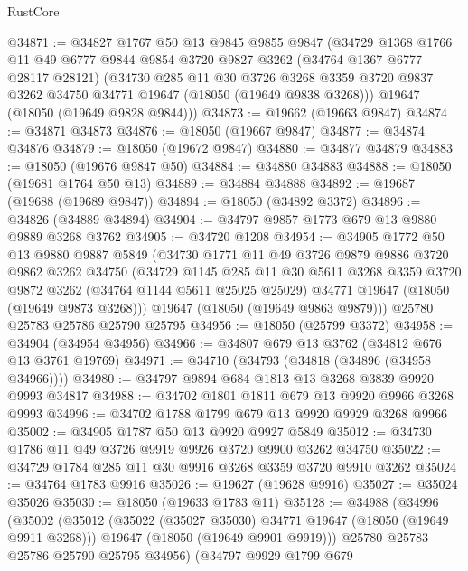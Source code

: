 \begin{lexlean}{RustCore}
\begin{coremodule}
@34871 := @34827
    @1767
    @50
    @13
    @9845
    @9855
    @9847
    (@34729
      @1368
      @1766
      @11
      @49
      @6777
      @9844
      @9854
      @3720
      @9827
      @3262
      (@34764 @1367 @6777 @28117 @28121)
      (@34730
        @285
        @11
        @30
        @3726
        @3268
        @3359
        @3720
        @9837
        @3262
        @34750
        @34771
        @19647
        (@18050 (@19649 @9838 @3268)))
      @19647
      (@18050 (@19649 @9828 @9844)))
@34873 := @19662 (@19663 @9847)
@34874 := @34871 @34873
@34876 := @18050 (@19667 @9847)
@34877 := @34874 @34876
@34879 := @18050 (@19672 @9847)
@34880 := @34877 @34879
@34883 := @18050 (@19676 @9847 @50)
@34884 := @34880 @34883
@34888 := @18050 (@19681 @1764 @50 @13)
@34889 := @34884 @34888
@34892 := @19687 (@19688 (@19689 @9847))
@34894 := @18050 (@34892 @3372)
@34896 := @34826 (@34889 @34894)
@34904 := @34797 @9857 @1773 @679 @13 @9880 @9889 @3268 @3762
@34905 := @34720 @1208
@34954 := @34905
    @1772
    @50
    @13
    @9880
    @9887
    @5849
    (@34730
      @1771
      @11
      @49
      @3726
      @9879
      @9886
      @3720
      @9862
      @3262
      @34750
      (@34729
        @1145
        @285
        @11
        @30
        @5611
        @3268
        @3359
        @3720
        @9872
        @3262
        (@34764 @1144 @5611 @25025 @25029)
        @34771
        @19647
        (@18050 (@19649 @9873 @3268)))
      @19647
      (@18050 (@19649 @9863 @9879)))
    @25780
    @25783
    @25786
    @25790
    @25795
@34956 := @18050 (@25799 @3372)
@34958 := @34904 (@34954 @34956)
@34966 := @34807 @679 @13 @3762 (@34812 @676 @13 @3761 @19769)
@34971 := @34710 (@34793 (@34818 (@34896 (@34958 @34966))))
@34980 := @34797 @9894 @684 @1813 @13 @3268 @3839 @9920 @9993 @34817
@34988 := @34702 @1801 @1811 @679 @13 @9920 @9966 @3268 @9993
@34996 := @34702 @1788 @1799 @679 @13 @9920 @9929 @3268 @9966
@35002 := @34905 @1787 @50 @13 @9920 @9927 @5849
@35012 := @34730 @1786 @11 @49 @3726 @9919 @9926 @3720 @9900 @3262 @34750
@35022 := @34729 @1784 @285 @11 @30 @9916 @3268 @3359 @3720 @9910 @3262
@35024 := @34764 @1783 @9916
@35026 := @19627 (@19628 @9916)
@35027 := @35024 @35026
@35030 := @18050 (@19633 @1783 @11)
@35128 := @34988
    (@34996
      (@35002
        (@35012
          (@35022 (@35027 @35030) @34771 @19647 (@18050 (@19649 @9911 @3268)))
          @19647
          (@18050 (@19649 @9901 @9919)))
        @25780
        @25783
        @25786
        @25790
        @25795
        @34956)
      (@34797
        @9929
        @1799
        @679

\end{coremodule}
\end{lexlean}
